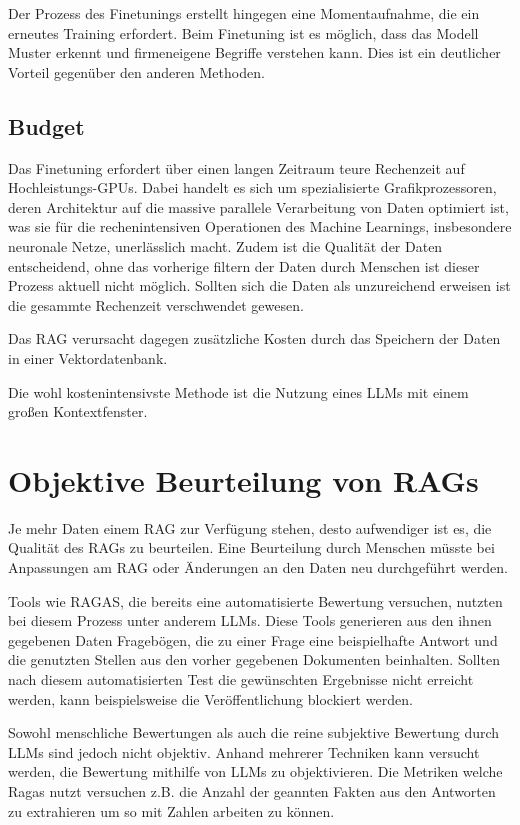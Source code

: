 Der Prozess des Finetunings erstellt hingegen eine Momentaufnahme, die ein erneutes Training erfordert.
Beim Finetuning ist es möglich, dass das Modell Muster erkennt und firmeneigene Begriffe verstehen kann. Dies ist ein deutlicher Vorteil gegenüber den anderen Methoden.


\subsection{Budget}
Das Finetuning erfordert über einen langen Zeitraum teure Rechenzeit auf Hochleistungs-GPUs.
Dabei handelt es sich um spezialisierte Grafikprozessoren, deren Architektur auf die massive parallele Verarbeitung von Daten optimiert ist, was sie für die rechenintensiven Operationen des Machine Learnings, insbesondere neuronale Netze, unerlässlich macht.
Zudem ist die Qualität der Daten entscheidend, ohne das vorherige filtern der Daten durch Menschen ist dieser Prozess aktuell nicht möglich. Sollten sich die Daten als unzureichend erweisen ist die gesammte Rechenzeit verschwendet gewesen.

Das RAG verursacht dagegen zusätzliche Kosten durch das Speichern der Daten in einer Vektordatenbank.

Die wohl kostenintensivste Methode ist die Nutzung eines LLMs mit einem großen Kontextfenster.


\section{Objektive Beurteilung von RAGs}
Je mehr Daten einem RAG zur Verfügung stehen, desto aufwendiger ist es, die Qualität des RAGs zu beurteilen.
Eine Beurteilung durch Menschen müsste bei Anpassungen am RAG oder Änderungen an den Daten neu durchgeführt werden.

Tools wie RAGAS, die bereits eine automatisierte Bewertung versuchen, nutzten bei diesem Prozess unter anderem LLMs.
Diese Tools generieren aus den ihnen gegebenen Daten Fragebögen, die zu einer Frage eine beispielhafte Antwort und die genutzten Stellen aus den vorher gegebenen Dokumenten beinhalten.
Sollten nach diesem automatisierten Test die gewünschten Ergebnisse nicht erreicht werden, kann beispielsweise die Veröffentlichung blockiert werden.

Sowohl menschliche Bewertungen als auch die reine subjektive Bewertung durch LLMs sind jedoch nicht objektiv.
Anhand mehrerer Techniken kann versucht werden, die Bewertung mithilfe von LLMs zu objektivieren. Die Metriken welche Ragas nutzt versuchen z.B. die Anzahl der geannten Fakten aus den Antworten zu extrahieren um so mit Zahlen arbeiten zu können.

